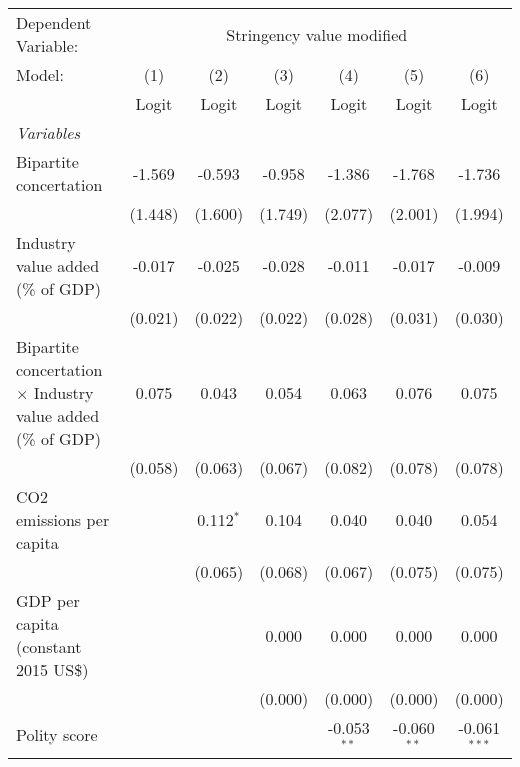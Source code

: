 
\begingroup
\centering
\begin{tabular}{lcccccc}
   \toprule
   Dependent Variable: & \multicolumn{6}{c}{Stringency value modified}\\
   Model:                                                             & (1)     & (2)         & (3)     & (4)           & (5)           & (6)\\  
                                                                      &  Logit  & Logit       & Logit   & Logit         & Logit         & Logit\\  
   \midrule
   \emph{Variables}\\
   Bipartite concertation                                             & -1.569  & -0.593      & -0.958  & -1.386        & -1.768        & -1.736\\   
                                                                      & (1.448) & (1.600)     & (1.749) & (2.077)       & (2.001)       & (1.994)\\   
   Industry value added (\% of GDP)                                   & -0.017  & -0.025      & -0.028  & -0.011        & -0.017        & -0.009\\   
                                                                      & (0.021) & (0.022)     & (0.022) & (0.028)       & (0.031)       & (0.030)\\   
   Bipartite concertation $\times$ Industry value added (\% of GDP)   & 0.075   & 0.043       & 0.054   & 0.063         & 0.076         & 0.075\\   
                                                                      & (0.058) & (0.063)     & (0.067) & (0.082)       & (0.078)       & (0.078)\\   
   CO2 emissions per capita                                           &         & 0.112$^{*}$ & 0.104   & 0.040         & 0.040         & 0.054\\   
                                                                      &         & (0.065)     & (0.068) & (0.067)       & (0.075)       & (0.075)\\   
   GDP per capita (constant 2015 US\$)                                &         &             & 0.000   & 0.000         & 0.000         & 0.000\\   
                                                                      &         &             & (0.000) & (0.000)       & (0.000)       & (0.000)\\   
   Polity score                                                       &         &             &         & -0.053$^{**}$ & -0.060$^{**}$ & -0.061$^{***}$\\   

\end{tabular}
